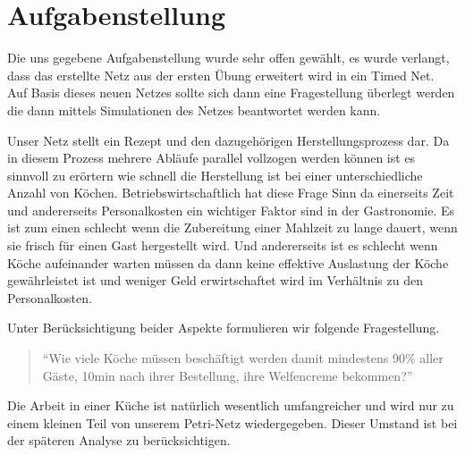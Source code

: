 \section*{Aufgabenstellung} %
\label{sec:aufgabenstellung}
Die uns gegebene Aufgabenstellung wurde sehr offen gewählt, es wurde verlangt, dass das erstellte Netz aus der ersten Übung erweitert wird in ein Timed Net. Auf Basis dieses neuen Netzes sollte sich dann eine Fragestellung überlegt werden die dann mittels Simulationen des Netzes beantwortet werden kann.

Unser Netz stellt ein Rezept und den dazugehörigen Herstellungsprozess dar. Da in diesem Prozess mehrere Abläufe parallel vollzogen werden können ist es sinnvoll zu erörtern wie schnell die Herstellung ist bei einer unterschiedliche Anzahl von Köchen. Betriebswirtschaftlich hat diese Frage Sinn da einerseits Zeit und andererseits Personalkosten ein wichtiger Faktor sind in der Gastronomie. Es ist zum einen schlecht wenn die Zubereitung einer Mahlzeit zu lange dauert, wenn sie frisch für einen Gast hergestellt wird. Und andererseits ist es schlecht wenn Köche aufeinander warten müssen da dann keine effektive Auslastung der Köche gewährleistet ist und weniger Geld erwirtschaftet wird im Verhältnis zu den Personalkosten.

Unter Berücksichtigung beider Aspekte formulieren wir folgende Fragestellung.

\begin{quote}
\begin{tt}
\begin{center}
``Wie viele Köche müssen beschäftigt werden damit mindestens 90\% aller Gäste, 10min nach ihrer Bestellung, ihre Welfencreme bekommen?''
\end{center}
\end{tt}
\end{quote}
Die Arbeit in einer Küche ist natürlich wesentlich umfangreicher und wird nur zu einem kleinen Teil von unserem Petri-Netz wiedergegeben. Dieser Umstand ist bei der späteren Analyse zu berücksichtigen.
